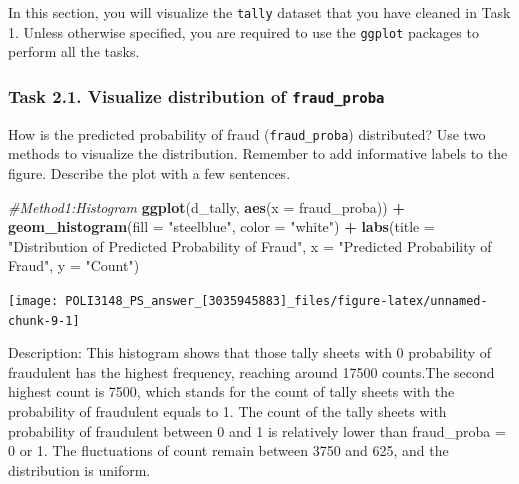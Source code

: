 \documentclass[
]{article}
\newenvironment{Shaded}{\begin{snugshade}}{\end{snugshade}}
\newcommand{\AttributeTok}[1]{\textcolor[rgb]{0.13,0.29,0.53}{#1}}
\newcommand{\CommentTok}[1]{\textcolor[rgb]{0.56,0.35,0.01}{\textit{#1}}}
\newcommand{\FunctionTok}[1]{\textcolor[rgb]{0.13,0.29,0.53}{\textbf{#1}}}
\newcommand{\NormalTok}[1]{#1}
\newcommand{\SpecialCharTok}[1]{\textcolor[rgb]{0.81,0.36,0.00}{\textbf{#1}}}
\newcommand{\StringTok}[1]{\textcolor[rgb]{0.31,0.60,0.02}{#1}}
\begin{document}
In this section, you will visualize the \texttt{tally} dataset that you
have cleaned in Task 1. Unless otherwise specified, you are required to
use the \texttt{ggplot} packages to perform all the tasks.

\hypertarget{task-2.1.-visualize-distribution-of-fraud_proba}{%
\subsubsection{\texorpdfstring{Task 2.1. Visualize distribution of
\texttt{fraud\_proba}}{Task 2.1. Visualize distribution of fraud\_proba}}\label{task-2.1.-visualize-distribution-of-fraud_proba}}

How is the predicted probability of fraud (\texttt{fraud\_proba})
distributed? Use two methods to visualize the distribution. Remember to
add informative labels to the figure. Describe the plot with a few
sentences.

\begin{Shaded}
\begin{Highlighting}[]
\CommentTok{\#Method1:Histogram }
\FunctionTok{ggplot}\NormalTok{(d\_tally, }\FunctionTok{aes}\NormalTok{(}\AttributeTok{x =}\NormalTok{ fraud\_proba)) }\SpecialCharTok{+}
  \FunctionTok{geom\_histogram}\NormalTok{(}\AttributeTok{fill =} \StringTok{"steelblue"}\NormalTok{, }\AttributeTok{color =} \StringTok{"white"}\NormalTok{) }\SpecialCharTok{+}
  \FunctionTok{labs}\NormalTok{(}\AttributeTok{title =} \StringTok{"Distribution of Predicted Probability of Fraud"}\NormalTok{,}
       \AttributeTok{x =} \StringTok{"Predicted Probability of Fraud"}\NormalTok{,}
       \AttributeTok{y =} \StringTok{"Count"}\NormalTok{)}
\end{Highlighting}
\end{Shaded}

\begin{center}\texttt{[image: POLI3148\_PS\_answer\_[3035945883]\_files/figure-latex/unnamed-chunk-9-1]} \end{center}

Description: This histogram shows that those tally sheets with 0
probability of fraudulent has the highest frequency, reaching around
17500 counts.The second highest count is 7500, which stands for the
count of tally sheets with the probability of fraudulent equals to 1.
The count of the tally sheets with probability of fraudulent between 0
and 1 is relatively lower than fraud\_proba = 0 or 1. The fluctuations
of count remain between 3750 and 625, and the distribution is uniform.
\end{document}
